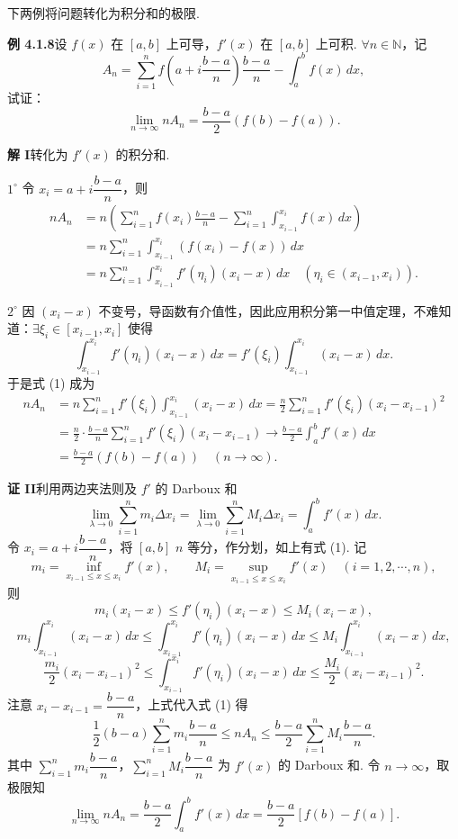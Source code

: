 \documentclass[UTF8,12pt,a4paper,fontset=fandol]{ctexart}
\begin{document}
下两例将问题转化为积分和的极限.

\noindent\textbf{例 4.1.8}\quad 设 $f(x)$ 在 $[a,b]$ 上可导，$f'(x)$ 在 $[a,b]$ 上可积. $\forall n\in\mathbb{N}$，记
\[
A_n=\sum_{i=1}^n f\left(a+i\frac{b-a}{n}\right)\frac{b-a}{n}
-\int_a^b f(x)\,dx,
\]
试证：
\[
\lim_{n\to\infty}nA_n=\frac{b-a}{2}(f(b)-f(a)).
\]

\noindent\textbf{解 I}\quad 转化为 $f'(x)$ 的积分和.

$1^\circ$ 令 $x_i=a+i\dfrac{b-a}{n}$，则
\begin{equation}
\begin{aligned}
nA_n
&=n\left(\sum_{i=1}^n f(x_i)\frac{b-a}{n}
-\sum_{i=1}^n\int_{x_{i-1}}^{x_i}f(x)\,dx\right)\\
&=n\sum_{i=1}^n\int_{x_{i-1}}^{x_i}(f(x_i)-f(x))\,dx\\
&=n\sum_{i=1}^n\int_{x_{i-1}}^{x_i}f'(\eta_i)(x_i-x)\,dx
\quad(\eta_i\in(x_{i-1},x_i)).
\end{aligned}
\tag{1}
\end{equation}

$2^\circ$ 因 $(x_i-x)$ 不变号，导函数有介值性，因此应用积分第一中值定理，不难知道：$\exists\xi_i\in[x_{i-1},x_i]$ 使得
\[
\int_{x_{i-1}}^{x_i}f'(\eta_i)(x_i-x)\,dx
=f'(\xi_i)\int_{x_{i-1}}^{x_i}(x_i-x)\,dx.
\]
于是式 (1) 成为
\[
\begin{aligned}
nA_n
&=n\sum_{i=1}^n f'(\xi_i)\int_{x_{i-1}}^{x_i}(x_i-x)\,dx
=\frac n2\sum_{i=1}^n f'(\xi_i)(x_i-x_{i-1})^2\\
&=\frac n2\cdot\frac{b-a}{n}\sum_{i=1}^n f'(\xi_i)(x_i-x_{i-1})
\to \frac{b-a}{2}\int_a^b f'(x)\,dx\\
&=\frac{b-a}{2}(f(b)-f(a))\quad(n\to\infty).
\end{aligned}
\]

\noindent\textbf{证 II}\quad 利用两边夹法则及 $f'$ 的 Darboux 和
\[
\lim_{\lambda\to0}\sum_{i=1}^n m_i\Delta x_i
=\lim_{\lambda\to0}\sum_{i=1}^n M_i\Delta x_i
=\int_a^b f'(x)\,dx.
\]
令 $x_i=a+i\dfrac{b-a}{n}$，将 $[a,b]$ $n$ 等分，作分划，如上有式 (1). 记
\[
m_i=\inf_{x_{i-1}\le x\le x_i}f'(x),\qquad
M_i=\sup_{x_{i-1}\le x\le x_i}f'(x)\quad(i=1,2,\cdots,n),
\]
则
\[
m_i(x_i-x)\le f'(\eta_i)(x_i-x)\le M_i(x_i-x),
\]
\[
m_i\int_{x_{i-1}}^{x_i}(x_i-x)\,dx
\le\int_{x_{i-1}}^{x_i}f'(\eta_i)(x_i-x)\,dx
\le M_i\int_{x_{i-1}}^{x_i}(x_i-x)\,dx,
\]
\[
\frac{m_i}{2}(x_i-x_{i-1})^2
\le\int_{x_{i-1}}^{x_i}f'(\eta_i)(x_i-x)\,dx
\le\frac{M_i}{2}(x_i-x_{i-1})^2.
\]
注意 $x_i-x_{i-1}=\dfrac{b-a}{n}$，上式代入式 (1) 得
\[
\frac12(b-a)\sum_{i=1}^n m_i\frac{b-a}{n}
\le nA_n\le
\frac{b-a}{2}\sum_{i=1}^n M_i\frac{b-a}{n}.
\]
其中 $\sum_{i=1}^n m_i\dfrac{b-a}{n}$，$\sum_{i=1}^n M_i\dfrac{b-a}{n}$ 为 $f'(x)$ 的 Darboux 和. 令 $n\to\infty$，取极限知
\[
\lim_{n\to\infty}nA_n
=\frac{b-a}{2}\int_a^b f'(x)\,dx
=\frac{b-a}{2}[f(b)-f(a)].
\]
\end{document}
